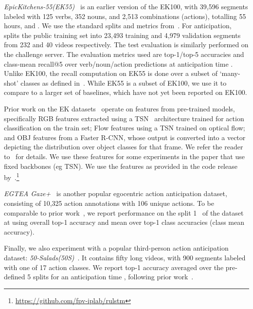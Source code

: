 \documentclass[10pt,twocolumn,letterpaper]{article}
\newcommand{\eknew}{EK100\xspace}
\newcommand{\ekfull}{EpicKitchens-55\xspace}
\newcommand{\ek}{EK55\xspace}
\newcommand{\saladfull}{50-Salads\xspace}
\newcommand{\salad}{50S\xspace}
\newcommand{\egtea}{EGTEA Gaze+\xspace}
\begin{document}
{\em \ekfull (\ek)}~\cite{Damen2018EPICKITCHENS} is an earlier version of the \eknew, with 39,596 segments labeled with 125 verbs, 352 nouns, and 2,513 combinations (actions), totalling 55 hours, and  . We use the standard splits and metrics from~\cite{furnari2020rulstm}.
For anticipation, \cite{furnari2020rulstm} splits the public training set into 23,493 training and 4,979 validation segments from 232 and 40 videos respectively. The test evaluation is similarly performed on the challenge server. The evaluation metrics used are top-1/top-5 accuracies and class-mean recall@5 over verb/noun/action predictions at anticipation time . 
Unlike \eknew, the recall computation on \ek is done over a subset of `many-shot' classes as defined in~\cite{furnari2019rulstm}.
While \ek is a subset of \eknew, 
we use it to compare to a larger set of baselines, which have not yet been reported on \eknew.

Prior work on the EK datasets~\cite{furnari2019rulstm,sener2020temporal} operate on features from pre-trained models, specifically RGB features extracted using a TSN~\cite{wang2016tsn} architecture trained for action classification on the train set; Flow features using a TSN trained on optical flow; and OBJ features from a Faster R-CNN, whose output is converted into a vector depicting the distribution over object classes for that frame. We refer the reader to~\cite{furnari2019rulstm} for details. We use these features for some experiments in the paper that use fixed backbones (eg TSN). We use the features as provided in the code release by~\cite{furnari2019rulstm}.\footnote{\url{https://github.com/fpv-iplab/rulstm}}


{\em \egtea}~\cite{li2018eye} is another popular egocentric action anticipation dataset, consisting of 10,325 action annotations with 106 unique actions. To be comparable to prior work~\cite{liu2020forecasting}, we report performance on the split 1~\cite{li2018eye} of the dataset at  using overall top-1 accuracy and mean over top-1 class accuracies (class mean accuracy).

Finally, we also experiment with a popular third-person action anticipation dataset:  
{\em \saladfull (\salad)}~\cite{stein2013combining}. It contains fifty  long videos, with 900 segments labeled with one of 17 action classes. We report top-1 accuracy averaged over the pre-defined 5 splits for an anticipation time , following prior work~\cite{sener2020temporal,abu2018will}.
\end{document}
